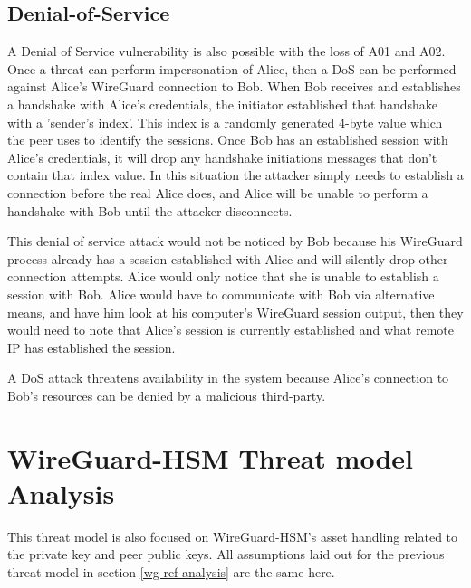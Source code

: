 \documentclass [11pt, proquest] {uwthesis}[2020/02/24]
\begin{document}
\subsection{Denial-of-Service}
\label{dos}
A Denial of Service vulnerability is also possible with the loss of A01 and A02. Once a threat can perform impersonation of Alice, then a DoS can be performed against Alice's WireGuard connection to Bob. When Bob receives and establishes a handshake with Alice's credentials, the initiator established that handshake with a 'sender's index'. This index is a randomly generated 4-byte value which the peer uses to identify the sessions. Once Bob has an established session with Alice's credentials, it will drop any handshake initiations messages that don't contain that index value. In this situation the attacker simply needs to establish a connection before the real Alice does, and Alice will be unable to perform a handshake with Bob until the attacker disconnects.

This denial of service attack would not be noticed by Bob because his WireGuard process already has a session established with Alice and will silently drop other connection attempts. Alice would only notice that she is unable to establish a session with Bob. Alice would have to communicate with Bob via alternative means, and have him look at his computer's WireGuard session output, then they would need to note that Alice's session is currently established and what remote IP has established the session.

A DoS attack threatens availability in the system because Alice's connection to Bob's resources can be denied by a malicious third-party.



\section{WireGuard-HSM Threat model Analysis}
\label{wg-hsm-analysis}
This threat model is also focused on WireGuard-HSM's asset handling related to the private key and peer public keys. All assumptions laid out for the previous threat model in section \ref{wg-ref-analysis} are the same here.
\end{document}
